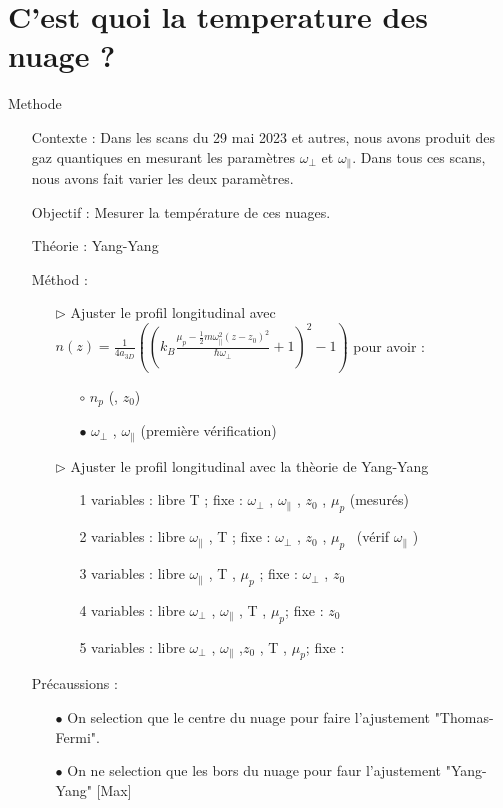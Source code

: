 \graphicspath{
{PHD/Etudes/GHD/Yang-Yang/Figures/}
}

\section{C'est quoi la temperature des nuage ?}
\begin{frame}[shrink=20]{Methode}
	
	\begin{itemize}
		\item[Contexte :]  Dans les scans du 29 mai 2023 et autres, nous avons produit des gaz quantiques en mesurant les paramètres $\omega_\perp$ et $\omega_\parallel$. Dans tous ces scans, nous avons fait varier les deux paramètres.
		\item[Objectif :] Mesurer la température de ces nuages.
		\item[Théorie :]	Yang-Yang
		\item[Méthod :]	
			\begin{itemize}
				\item[$\rhd$] Ajuster le profil longitudinal avec $ n(z)  = \frac{1}{4 a_{3D}} \left (  \left ( k_B \frac{ \mu_p - \frac{1}{2} m \omega_ \parallel^2 (z-z_0)^2 }{\hbar \omega_\perp} + 1 \right )^2 - 1 \right ) $ pour avoir :  
					\begin{itemize}
						\item[$\circ$] $n_p$ (, $z_0$)
						\item[$\bullet$] $\omega_\perp$ , $\omega_ \parallel$ (première vérification)
					\end{itemize} 
				\item[$\rhd$] Ajuster le profil longitudinal avec la thèorie de Yang-Yang 
					\begin{itemize}
						\item[1] variables : libre T ; fixe : $\omega_\perp$ , $\omega_\parallel$ , $z_0$ , $\mu_p$ (mesurés)
						\item[2] variables : libre $\omega_\parallel$ , T ; fixe : $\omega_\perp$ , $z_0$ , $\mu_p$ ~(vérif $\omega_\parallel$ )
						\item[3] variables : libre $\omega_\parallel$ , T  , $\mu_p$ ; fixe : $\omega_\perp$ ,  $z_0$
						\item[4] variables : libre $\omega_\perp$ , $\omega_\parallel$ , T , $\mu_p$; fixe :  $z_0$ 
						\item[5] variables : libre $\omega_\perp$ , $\omega_\parallel$ ,$z_0$  ,  T , $\mu_p$; fixe :  
					\end{itemize} 
			\end{itemize} 
		\item[ Précaussions ]  :
			\begin{itemize}
				\item[$\bullet$] On selection que le centre du nuage pour faire l'ajustement "Thomas-Fermi". 
				\item[$\bullet$] On ne selection que les bors du nuage pour faur l'ajustement "Yang-Yang" [Max]
			\end{itemize} 
	\end{itemize}  
	



\end{frame}
